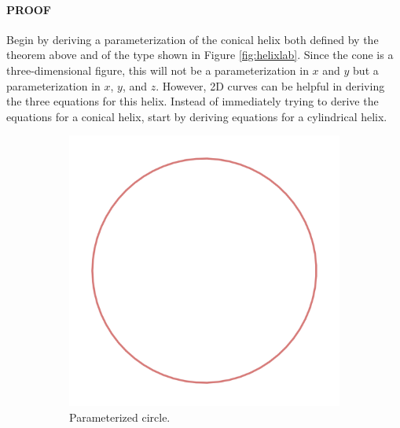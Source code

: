 \documentclass{article}
\begin{document}
\paragraph{PROOF} Begin by deriving a parameterization of the conical helix both defined by the theorem above and of the type shown in Figure \ref{fig:helixlab}. Since the cone is a three-dimensional figure, this will not be a parameterization in $x$ and $y$ but a parameterization in $x$, $y$, and $z$. However, 2D curves can be helpful in deriving the three equations for this helix. Instead of immediately trying to derive the equations for a conical helix, start by deriving equations for a cylindrical helix.

\begin{figure}[h!]
    \centering
    \begin{subfigure}{0.3\linewidth}
        \includegraphics[width=\linewidth]{Blender/helixca.png}
        \caption{Parameterized circle.}
        \label{fig:helixca}
    \end{subfigure}
    \begin{subfigure}{0.3\linewidth}

\end{subfigure}
\end{figure}
\end{document}
